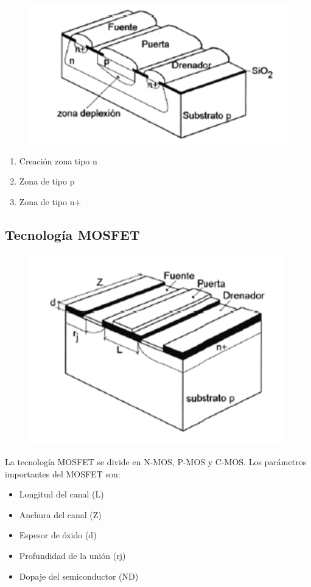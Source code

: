 \begin{figure}[H]
    \centering
    \includegraphics[width=0.5\linewidth]{Imagenes/Tecnologia de CI - JFET.png}
\end{figure}

\begin{enumerate}
    \item Creación zona tipo n
    \item Zona de tipo p
    \item Zona de tipo n+
\end{enumerate}

\subsection{Tecnología MOSFET}

\begin{figure}[H]
    \centering
    \includegraphics[width=0.5\linewidth]{Imagenes/Tecnologia de CI - MOSFTE.png}
\end{figure}

La tecnología MOSFET se divide en N-MOS, P-MOS y C-MOS. Los parámetros importantes del MOSFET son:

\begin{itemize}
    \item Longitud del canal (L)
    \item Anchura del canal (Z)
    \item Espesor de óxido (d)
    \item Profundidad de la unión (rj)
    \item Dopaje del semiconductor (ND)
\end{itemize}

